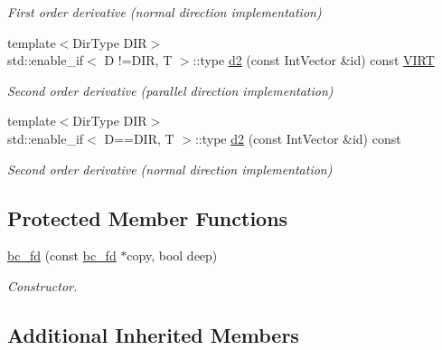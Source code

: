 \begin{DoxyCompactItemize}
\begin{DoxyCompactList}\small\item\em First order derivative (normal direction implementation) \end{DoxyCompactList}\item 
{\footnotesize template$<$Dir\+Type D\+IR$>$ }\\std\+::enable\+\_\+if$<$ D !=D\+IR, T $>$\+::type \hyperlink{classUintah_1_1PhaseField_1_1detail_1_1bc__fd_3_01ScalarField_3_01T_01_4_00_01STN_00_01NC_00_01Fc8a6e28ffa258d282d0a921216b0ed9f_a11859a7618bbd2410f1835a58d8a5e21}{d2} (const Int\+Vector \&id) const \hyperlink{Definitions_8h_a3ce9c14452594b5b9ee3b63f9b3a981e}{V\+I\+RT}
\begin{DoxyCompactList}\small\item\em Second order derivative (parallel direction implementation) \end{DoxyCompactList}\item 
{\footnotesize template$<$Dir\+Type D\+IR$>$ }\\std\+::enable\+\_\+if$<$ D==D\+IR, T $>$\+::type \hyperlink{classUintah_1_1PhaseField_1_1detail_1_1bc__fd_3_01ScalarField_3_01T_01_4_00_01STN_00_01NC_00_01Fc8a6e28ffa258d282d0a921216b0ed9f_a33267c99082064cb0db44ac7e4d0c89b}{d2} (const Int\+Vector \&id) const
\begin{DoxyCompactList}\small\item\em Second order derivative (normal direction implementation) \end{DoxyCompactList}\end{DoxyCompactItemize}
\subsection*{Protected Member Functions}
\begin{DoxyCompactItemize}
\item 
\hyperlink{classUintah_1_1PhaseField_1_1detail_1_1bc__fd_3_01ScalarField_3_01T_01_4_00_01STN_00_01NC_00_01Fc8a6e28ffa258d282d0a921216b0ed9f_a847bfeaf6f5d7dd5e32c1f9ff5df4a60}{bc\+\_\+fd} (const \hyperlink{classUintah_1_1PhaseField_1_1detail_1_1bc__fd}{bc\+\_\+fd} $\ast$copy, bool deep)
\begin{DoxyCompactList}\small\item\em Constructor. \end{DoxyCompactList}\end{DoxyCompactItemize}
\subsection*{Additional Inherited Members}


